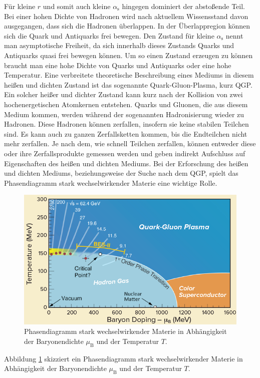 F\"ur kleine $r$ und somit auch kleine $\alpha_\text{s}$ hingegen dominiert der absto{\ss}ende Teil.
Bei einer hohen Dichte von Hadronen wird nach aktuellem Wissensstand davon ausgegangen, dass sich die Hadronen \"uberlappen.
In der \"Uberlappregion k\"onnen sich die Quark und Antiquarks frei bewegen.
Den Zustand f\"ur kleine $\alpha_\text{s}$ nennt man asymptotische Freiheit, da sich innerhalb dieses Zustands Quarks und Antiquarks quasi frei bewegen k\"onnen.
Um so einen Zustand erzeugen zu k\"onnen braucht man eine hohe Dichte von Quarks und Antiquarks oder eine hohe Temperatur.
Eine verbreitete theoretische Beschreibung eines Mediums in diesem hei{\ss}en und dichten Zustand ist das sogenannte Quark-Gluon-Plasma, kurz QGP.
\newline
Ein solcher hei{\ss}er und dichter Zustand kann kurz nach der Kollision von zwei hochenergetischen Atomkernen entstehen.
Quarks und Gluonen, die aus diesem Medium kommen, werden w\"ahrend der sogenannten Hadronisierung wieder zu Hadronen.
Diese Hadronen k\"onnen zerfallen, insofern sie keine stabilen Teilchen sind.
Es kann auch zu ganzen Zerfallsketten kommen, bis die Endteilchen nicht mehr zerfallen.
Je nach dem, wie schnell Teilchen zerfallen, k\"onnen entweder diese oder ihre Zerfallsprodukte gemessen werden und geben indirekt Aufschluss auf Eigenschaften des hei{\ss}en und dichten Mediums.
\newline
Bei der Erforschung des hei{\ss}en und dichten Mediums, beziehungsweise der Suche nach dem QGP, spielt das Phasendiagramm stark wechselwirkender Materie eine wichtige Rolle.
\begin{figure}[thp]
\centering
\includegraphics[width=.7\linewidth]{QGPPhaseDiagram.png}
\caption{Phasendiagramm stark wechselwirkender Materie in Abh\"angigkeit der Baryonendichte $\mu_{\text{B}}$ und der Temperatur $T$.
\cite{PAPER:1}}
\label{fig:QGPPhase}
\end{figure}
Abbildung \ref{fig:QGPPhase} skizziert ein Phasendiagramm stark wechselwirkender Materie in Abh\"angigkeit der Baryonendichte $\mu_{\text{B}}$ und der Temperatur $T$.
